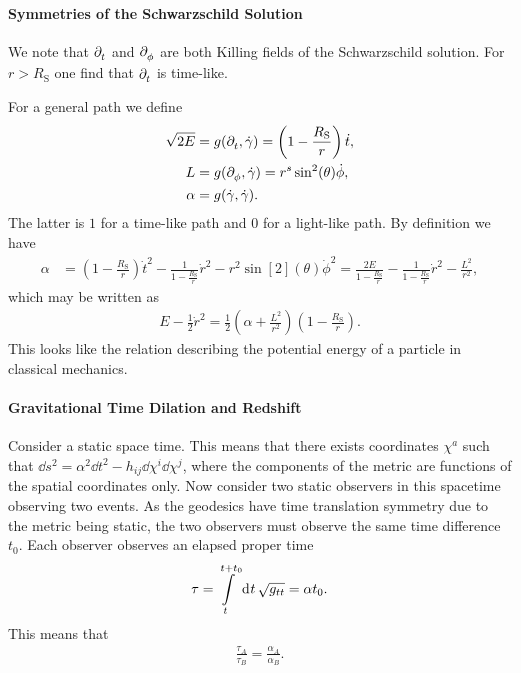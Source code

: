 \paragraph{Symmetries of the Schwarzschild Solution}
We note that $\partial^{}_{t}$ and $\partial^{}_{\phi}$ are both Killing fields of the Schwarzschild solution. For $r > R_{\text{S}}$ one find that $\partial^{}_{t}$ is time-like.

For a general path we define
\begin{align*}
	\sqrt{2E} &= g(\partial^{}_{t}, \dot{\gamma}) = \left(1 - \frac{R_{\text{S}}}{r}\right)\dot{t}, \\
	L         &= g(\partial^{}_{\phi}, \dot{\gamma}) = r^{s}\sin[2](\theta)\dot{\phi}, \\
	\alpha    &= g(\dot{\gamma}, \dot{\gamma}).
\end{align*}
The latter is $1$ for a time-like path and $0$ for a light-like path. By definition we have
\begin{align*}
	\alpha &= \left(1 - \frac{R_{\text{S}}}{r}\right)\dot{t}^{2} - \frac{1}{1 - \frac{R_{\text{S}}}{r}}\dot{r}^{2} - r^{2}\sin[2](\theta)\dot{\phi}^{2} = \frac{2E}{1 - \frac{R_{\text{S}}}{r}} - \frac{1}{1 - \frac{R_{\text{S}}}{r}}\dot{r}^{2} - \frac{L^{2}}{r^{2}},
\end{align*}
which may be written as
\begin{align*}
	E - \frac{1}{2}\dot{r}^{2} = \frac{1}{2}\left(\alpha + \frac{L^{2}}{r^{2}}\right)\left(1 - \frac{R_{\text{S}}}{r}\right).
\end{align*}
This looks like the relation describing the potential energy of a particle in classical mechanics.

\paragraph{Gravitational Time Dilation and Redshift}
Consider a static space time. This means that there exists coordinates $\chi^{a}$ such that $\dd{s}^{2} = \alpha^{2}\dd{t}^{2} - h_{ij}\dd{\chi}^{i}\dd{\chi}^{j}$, where the components of the metric are functions of the spatial coordinates only. Now consider two static observers in this spacetime observing two events. As the geodesics have time translation symmetry due to the metric being static, the two observers must observe the same time difference $t_{0}$. Each observer observes an elapsed proper time
\begin{align*}
	\tau = \int\limits_{t}^{t + t_{0}}\dd[]{t}\sqrt{g_{tt}} = \alpha t_{0}.
\end{align*}
This means that
\begin{align*}
	\frac{\tau_{A}}{\tau_{B}} = \frac{\alpha_{A}}{\alpha_{B}}.
\end{align*}

